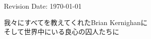 \vspace{1cm}

\noindent Revision Date: \today \\

\normalsize

\newpage

\thispagestyle{empty}

\vspace*{5cm}
\begin{center}
\hspace{0cm}我々にすべてを教えてくれたBrian Kernighanに\\
そして世界中にいる良心の囚人たちに
\end{center}

\newpage

\thispagestyle{empty}
\mbox{}    %

